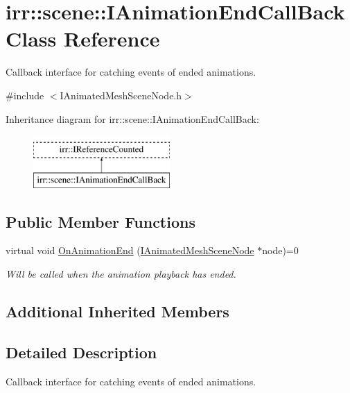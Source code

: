\hypertarget{classirr_1_1scene_1_1IAnimationEndCallBack}{}\section{irr\+:\+:scene\+:\+:I\+Animation\+End\+Call\+Back Class Reference}
\label{classirr_1_1scene_1_1IAnimationEndCallBack}


Callback interface for catching events of ended animations.  




{\ttfamily \#include $<$I\+Animated\+Mesh\+Scene\+Node.\+h$>$}

Inheritance diagram for irr\+:\+:scene\+:\+:I\+Animation\+End\+Call\+Back\+:\begin{figure}[H]
\begin{center}
\leavevmode
\includegraphics[height=2.000000cm]{classirr_1_1scene_1_1IAnimationEndCallBack}
\end{center}
\end{figure}
\subsection*{Public Member Functions}
\begin{DoxyCompactItemize}
\item 
virtual void \hyperlink{classirr_1_1scene_1_1IAnimationEndCallBack_a7676b37828697b63e42ad5264274cc1f}{On\+Animation\+End} (\hyperlink{classirr_1_1scene_1_1IAnimatedMeshSceneNode}{I\+Animated\+Mesh\+Scene\+Node} $\ast$node)=0
\begin{DoxyCompactList}\small\item\em Will be called when the animation playback has ended. \end{DoxyCompactList}\end{DoxyCompactItemize}
\subsection*{Additional Inherited Members}


\subsection{Detailed Description}
Callback interface for catching events of ended animations. 


